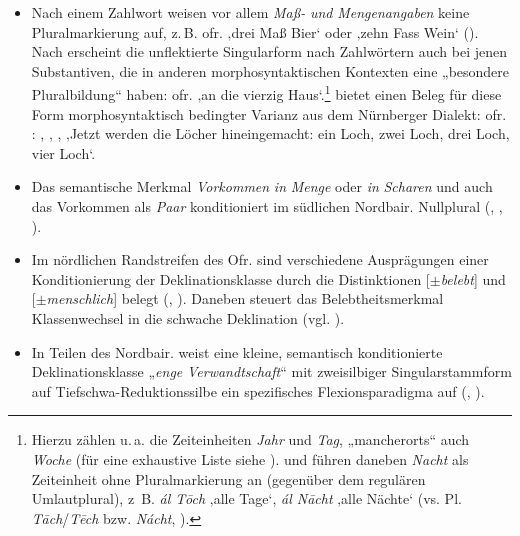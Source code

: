 \begin{itemize}\sloppy
\item Nach einem Zahlwort weisen vor allem \textit{Maß-} \textit{und} \textit{Mengenangaben} keine Pluralmarkierung auf, z.\,B. ofr.    ‚drei Maß Bier‘ oder    ‚zehn Fass Wein‘ (\citealt[§279]{Gebhardt1907}). Nach \citet[105]{Rowley1997} erscheint die unflektierte Singularform nach Zahlwörtern auch bei jenen Substantiven, die in anderen morphosyntaktischen Kontexten eine „besondere Pluralbildung“ haben: ofr.     ‚an die vierzig Haus‘.\footnote{Hierzu zählen u.\,a. die Zeiteinheiten \textit{Jahr} und \textit{Tag}, „mancherorts“ \citep[188]{Rowley1997} auch \textit{Woche} (für eine exhaustive Liste siehe \citealt[188]{Rowley1997}). \citet[78]{Wittmann1943} und \citet[318]{Schiepek1908} führen daneben \textit{Nacht} als Zeiteinheit ohne Pluralmarkierung an (gegenüber dem regulären Umlautplural), z~B. \textit{ál Tōch} ‚alle Tage‘, \textit{ál Nācht} ‚alle Nächte‘ (vs. Pl. \textit{Tāch}/\textit{Tēch} bzw. \textit{Nácht}, \citealt[318]{Schiepek1908}).} \citet[§279]{Gebhardt1907} bietet einen Beleg für diese Form morphosyntaktisch bedingter Varianz aus dem Nürnberger Dialekt: ofr.     :  ,  ,  ,   ‚Jetzt werden die Löcher hineingemacht: ein Loch, zwei Loch, drei Loch, vier Loch‘.
\item Das semantische Merkmal \textit{Vorkommen} \textit{in} \textit{Menge} oder \textit{in} \textit{Scharen} und auch das Vorkommen als \textit{Paar} konditioniert im südlichen Nordbair. Nullplural (\citealt[102]{Denz1977}, \citealt[§140.6]{Kollmer1987}, \citealt[148, 159]{Rowley1997}).
\item Im nördlichen Randstreifen des Ofr. sind verschiedene Ausprägungen einer Konditionierung der Deklinationsklasse durch die Distinktionen [${\pm}$\textit{be\-lebt}] und [${\pm}$\textit{menschlich}] belegt (\citealt{HarnischRowley1990}, \citealt[191]{Rowley1997}). Daneben steuert das Belebtheitsmerkmal Klassenwechsel in die schwache Deklination (vgl. \citealt[§20--21]{Micko-Repp1933}).
\item In Teilen des Nordbair. weist eine kleine, semantisch konditionierte Deklinationsklasse „\textit{enge} \textit{Verwandtschaft}“ mit zweisilbiger Singularstammform auf Tiefschwa-Reduktionssilbe ein spezifisches Flexionsparadigma auf (\citealt[137]{Rowley1997}, \citealt[122]{Steininger1994}).
\end{itemize}

